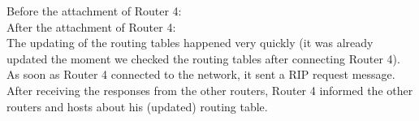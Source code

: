 Before the attachment of Router 4: \\







After the attachment of Router 4: \\







The updating of the routing tables happened very quickly (it was already updated the moment we checked the routing tables after connecting Router 4). As soon as Router 4 connected to the network, it sent a RIP request message. After receiving the responses from the other routers, Router 4 informed the other routers and hosts about his (updated) routing table.
